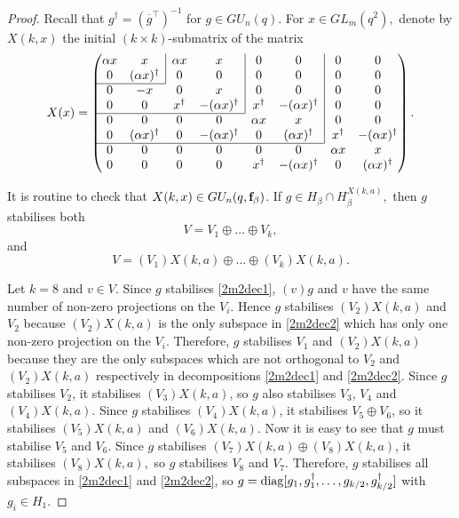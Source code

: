 \begin{proof}
Recall that $g^{\dagger}=(\overline{g}^{\top})^{-1}$ for $g \in GU_n(q).$ For $x \in GL_m(q^2),$ denote by $X(k,x)$ the initial $(k \times k)$-submatrix  of the  matrix
\begin{equation*}
X(x)= \begin{pmatrix} 
\alpha x& \multicolumn{1}{c|}{x} & \alpha x& \multicolumn{1}{c|}{x}&0&\multicolumn{1}{c|}{0}&0&0\\
0&\multicolumn{1}{c|}{(\alpha x)^{\dagger}}& 0&\multicolumn{1}{c|}{0}&0&\multicolumn{1}{c|}{0}&0&0\\ \cline{1-2}
0& -x& 0 &\multicolumn{1}{c|}{x}&0&\multicolumn{1}{c|}{0}&0&0\\
0 & 0&x^{\dagger}&\multicolumn{1}{c|}{-(\alpha x)^{\dagger}}&x^{\dagger}&\multicolumn{1}{c|}{-(\alpha x)^{\dagger}}&0&0\\ \cline{1-4}
0&0&0&0&\alpha x&\multicolumn{1}{c|}{x}&0&0\\
0& (\alpha x)^{\dagger}&0&-(\alpha x)^{\dagger}&0&\multicolumn{1}{c|}{(\alpha x)^{\dagger}}&x^{\dagger}&-(\alpha x)^{\dagger}\\ \cline{1-6}
0&0&0&0&0&0&\alpha x& x\\
0&0&0&0&x^{\dagger}&-(\alpha x)^{\dagger}&0& (\alpha x)^{\dagger}
\end{pmatrix}.
\end{equation*}

It is routine to check that $X(k,x) \in GU_n(q, {\bf f}_{\beta})$. If $g \in H_{\beta} \cap H_{\beta}^{X(k,a)},$  then $g$ stabilises both 
\begin{equation}\label{2m2dec1}
V=V_1 \oplus \ldots \oplus V_k,
\end{equation}
and
\begin{equation}\label{2m2dec2}
V=(V_1){X(k,a)} \oplus \ldots \oplus (V_k) {X(k,a)}.
\end{equation}

Let $k=8$ and $v \in V$. Since $g$ stabilises \eqref{2m2dec1}, $(v)g$ and $v$ have the same number of non-zero projections on the $V_i$.  Hence $g$ stabilises $(V_2)X(k,a)$ and $V_2$ because $(V_2)X(k,a)$ is the only subspace in \eqref{2m2dec2} which has only one non-zero projection on the $V_i$. Therefore, $g$ stabilises  $V_1$ and $(V_2)X(k,a)$ because they are the only subspaces which are not orthogonal to $V_2$  and $(V_2)X(k,a)$ respectively in decompositions \eqref{2m2dec1} and \eqref{2m2dec2}. Since $g$ stabilises $V_2$, it stabilises $(V_3)X(k,a)$, so $g$ also stabilises $V_3$, $V_4$ and $(V_4)X(k,a).$ Since $g$ stabilises $(V_4)X(k,a)$, it stabilises $V_5 \oplus V_6$, so it stabilises $(V_5)X(k,a)$ and $(V_6)X(k,a).$ Now it is easy to see that $g$ must stabilise $V_5$ and $V_6.$ Since $g$ stabilises $(V_7)X(k,a) \oplus (V_8)X(k,a)$, it stabilises $(V_8)X(k,a),$ so $g$ stabilises $V_8$ and $V_7.$ Therefore, $g$ stabilises all subspaces in \eqref{2m2dec1} and \eqref{2m2dec2}, so $g=\mathrm{diag}[g_1, g_1^{\dagger}, \ldots, g_{k/2}, g_{k/2}^{\dagger}]$ with $g_i \in H_1.$ 


\end{proof}
